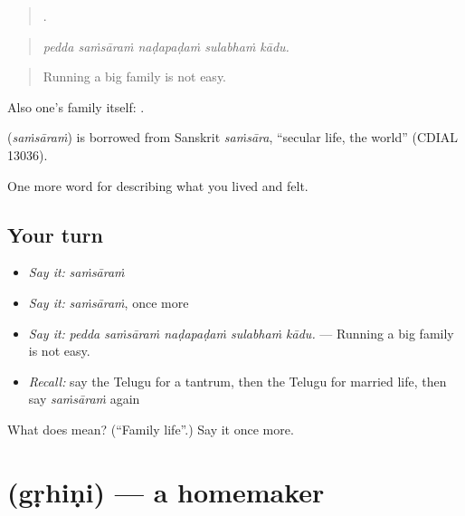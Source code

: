 \begin{quote}
    .
\end{quote}

\begin{quote}
\emph{pedda saṁsāraṁ naḍapaḍaṁ sulabhaṁ kādu.}
\end{quote}

\begin{quote}
Running a big family is not easy.
\end{quote}

Also one's family itself:  .

\begin{cousinweb}
\textbf{} (\emph{saṁsāraṁ}) is borrowed from Sanskrit \emph{saṁsāra}, \textquotedblleft{}secular life, the world\textquotedblright{} (CDIAL 13036).
\end{cousinweb}

\begin{grammarlens}[title={What you've built}]
One more word for describing what you lived and felt.
\end{grammarlens}

\subsection*{Your turn}
\begin{itemize}
\raggedright
  \item \emph{Say it:} \emph{saṁsāraṁ}
  \item \emph{Say it:} \emph{saṁsāraṁ}, once more
  \item \emph{Say it:} \emph{pedda saṁsāraṁ naḍapaḍaṁ sulabhaṁ kādu.} — Running a big family is not easy.
  \item \emph{Recall:} say the Telugu for a tantrum, then the Telugu for married life, then say \emph{saṁsāraṁ} again
\end{itemize}

\begin{tcolorbox}[breakable,colback=teal!4,colframe=teal!35!black,title={Before you move on}]
What does  mean? (\textquotedblleft{}Family life\textquotedblright{}.) Say it once more.
\end{tcolorbox}
\section[\texorpdfstring{\te{గృహిణి} (gṛhiṇi)}{గృహిణి (gṛhiṇi)}]{ (gṛhiṇi) — a homemaker}

